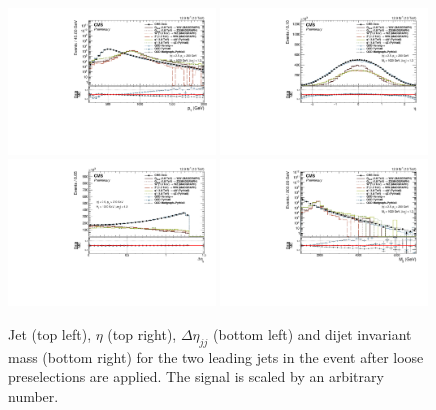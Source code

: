 \begin{figure}[h!]
\centering
\includegraphics[width=0.49\textwidth]{figures/analysis/search2/AN-16-235/plots/qcdcp_Pt.pdf}
\includegraphics[width=0.49\textwidth]{figures/analysis/search2/AN-16-235/plots/qcdcp_Eta.pdf}\\
\includegraphics[width=0.49\textwidth]{figures/analysis/search2/AN-16-235/plots/qcdcp_DeltaEta.pdf}
\includegraphics[width=0.49\textwidth]{figures/analysis/search2/AN-16-235/plots/qcdcp_Mjj.pdf}
\caption{Jet \PT{} (top left), $\eta$ (top right), $\Delta \eta_{jj}$ (bottom left) and dijet invariant mass (bottom right) for the two leading jets in the event after loose preselections are applied. The signal is scaled by an arbitrary number.}
\label{fig:searchII:kinematics-all}
\end{figure}
